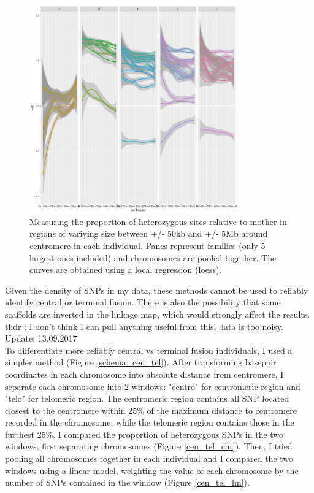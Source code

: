 \documentclass[10pt,a4paper]{report}
\begin{document}
\begin{figure}[h]
	\begin{center}
		\includegraphics[width=0.8\textwidth]{Num_CSD_loci/pooled_chrom_centrosize_50k_5M.pdf}
		\caption{Measuring the proportion of heterozygous sites relative to mother in regions of variying size between +/- 50kb and +/- 5Mb around centromere in each individual. Panes represent families (only 5 largest ones included) and chromosomes are pooled together. The curves are obtained using a local regression (loess).}
		\label{proto_surround_fusion}
	\end{center}
\end{figure}

Given the density of SNPs in my data, these methods cannot be used to reliably identify central or terminal fusion. There is also the possibility that some scaffolds are inverted in the linkage map, which would strongly affect the results.\\

tl;dr : I don't think I can pull anything useful from this, data is too noisy. \\

\FloatBarrier
Update: 13.09.2017\\
To differentiate more reliably central vs terminal fusion individuals, I used a simpler method (Figure \ref{schema_cen_tel}). After transforming basepair coordinates in each chromosome into absolute distance from centromere, I separate each chromosome into 2 windows: "centro" for centromeric region and "telo" for telomeric region. The centromeric region contains all SNP located closest to the centromere within 25\% of the maximum distance to centromere recorded in the chromosome, while the telomeric region contains those in the furthest 25\%. I compared the proportion of heterozygous SNPs in the two windows, first separating chromosomes (Figure \ref{cen_tel_chr}). Then, I tried pooling all chromosomes together in each individual and I compared the two windows using a linear model, weighting the value of each chromosome by the number of SNPs contained in the window (Figure \ref{cen_tel_lm}).
\end{document}
